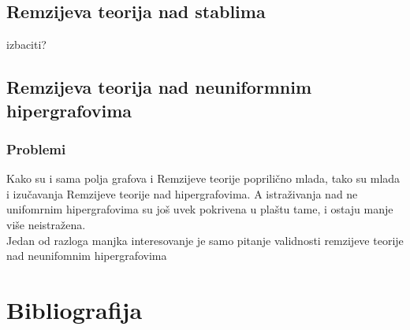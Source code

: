 \documentclass[a4paper]{article}
\begin{document}
	\subsection{Remzijeva teorija nad stablima}
	izbaciti?
	\subsection{Remzijeva teorija nad neuniformnim hipergrafovima}
	\subsubsection{Problemi}
	Kako su i sama polja grafova i Remzijeve teorije poprilično mlada, tako su mlada i izučavanja Remzijeve teorije nad hipergrafovima. A istraživanja nad ne unifomrnim hipergrafovima su još uvek pokrivena u plaštu tame, i ostaju manje više neistražena. \\
	Jedan od razloga manjka interesovanje je samo pitanje validnosti remzijeve teorije nad neunifomnim hipergrafovima %
	\section{Bibliografija}	
	\printbibliography
\end{document}
